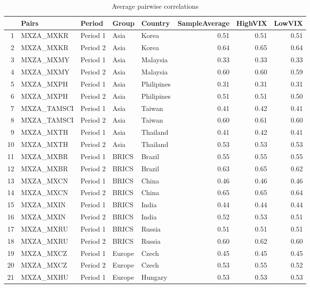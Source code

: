 \documentclass[11pt,preprint, authoryear]{elsarticle}
\numberwithin{equation}{section}
\numberwithin{figure}{section}
\numberwithin{table}{section}
\begin{document}
\begin{longtable}{rllllrrr}
\caption{Average pairwise correlations \label{pairwise}} \\ 
  \hline
 & Pairs & Period & Group & Country & SampleAverage & HighVIX & LowVIX \\ 
  \hline
1 & MXZA\_MXKR & Period 1 & Asia & Korea & 0.51 & 0.51 & 0.51 \\ 
  2 & MXZA\_MXKR & Period 2 & Asia & Korea & 0.64 & 0.65 & 0.64 \\ 
  3 & MXZA\_MXMY & Period 1 & Asia & Malaysia & 0.33 & 0.33 & 0.33 \\ 
  4 & MXZA\_MXMY & Period 2 & Asia & Malaysia & 0.60 & 0.60 & 0.59 \\ 
  5 & MXZA\_MXPH & Period 1 & Asia & Philipines & 0.31 & 0.31 & 0.31 \\ 
  6 & MXZA\_MXPH & Period 2 & Asia & Philipines & 0.51 & 0.51 & 0.50 \\ 
  7 & MXZA\_TAMSCI & Period 1 & Asia & Taiwan & 0.41 & 0.42 & 0.41 \\ 
  8 & MXZA\_TAMSCI & Period 2 & Asia & Taiwan & 0.60 & 0.61 & 0.60 \\ 
  9 & MXZA\_MXTH & Period 1 & Asia & Thailand & 0.41 & 0.42 & 0.41 \\ 
  10 & MXZA\_MXTH & Period 2 & Asia & Thailand & 0.53 & 0.53 & 0.53 \\ 
  11 & MXZA\_MXBR & Period 1 & BRICS & Brazil & 0.55 & 0.55 & 0.55 \\ 
  12 & MXZA\_MXBR & Period 2 & BRICS & Brazil & 0.63 & 0.65 & 0.62 \\ 
  13 & MXZA\_MXCN & Period 1 & BRICS & China & 0.46 & 0.46 & 0.46 \\ 
  14 & MXZA\_MXCN & Period 2 & BRICS & China & 0.65 & 0.65 & 0.64 \\ 
  15 & MXZA\_MXIN & Period 1 & BRICS & India & 0.44 & 0.44 & 0.44 \\ 
  16 & MXZA\_MXIN & Period 2 & BRICS & India & 0.52 & 0.53 & 0.51 \\ 
  17 & MXZA\_MXRU & Period 1 & BRICS & Russia & 0.51 & 0.51 & 0.51 \\ 
  18 & MXZA\_MXRU & Period 2 & BRICS & Russia & 0.60 & 0.62 & 0.60 \\ 
  19 & MXZA\_MXCZ & Period 1 & Europe & Czech & 0.45 & 0.45 & 0.45 \\ 
  20 & MXZA\_MXCZ & Period 2 & Europe & Czech & 0.53 & 0.55 & 0.52 \\ 
  21 & MXZA\_MXHU & Period 1 & Europe & Hungary & 0.53 & 0.53 & 0.53 \\ 

\end{longtable}
\end{document}
